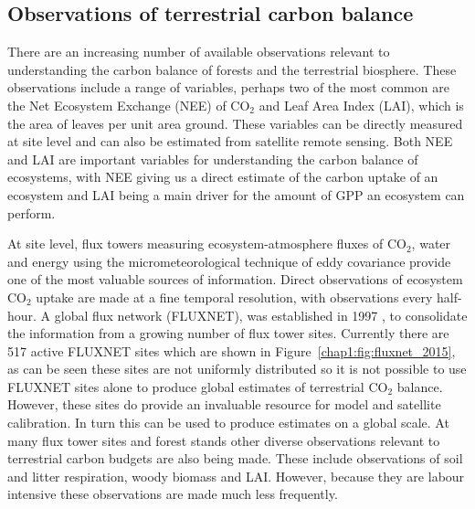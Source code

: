 


\subsection{Observations of terrestrial carbon balance}

There are an increasing number of available observations relevant to understanding the carbon balance of forests and the terrestrial biosphere. These observations include a range of variables, perhaps two of the most common are the Net Ecosystem Exchange (NEE) of CO\(_{2}\) and Leaf Area Index (LAI), which is the area of leaves per unit area ground. These variables can be directly measured at site level and can also be estimated from satellite remote sensing. Both NEE and LAI are important variables for understanding the carbon balance of ecosystems, with NEE giving us a direct estimate of the carbon uptake of an ecosystem and LAI being a main driver for the amount of GPP an ecosystem can perform.

At site level, flux towers measuring ecosystem-atmosphere fluxes of CO\(_{2}\), water and energy using the micrometeorological technique of eddy covariance provide one of the most valuable sources of information. Direct observations of ecosystem CO\(_{2}\) uptake are made at a fine temporal resolution, with observations every half-hour. A global flux network (FLUXNET), was established in 1997 \citep{baldocchi2001fluxnet}, to consolidate the information from a growing number of flux tower sites. Currently there are 517 active FLUXNET sites which are shown in Figure~\ref{chap1:fig:fluxnet_2015}, as can be seen these sites are not uniformly distributed so it is not possible to use FLUXNET sites alone to produce global estimates of terrestrial CO\(_{2}\) balance. However, these sites do provide an invaluable resource for model and satellite calibration. In turn this can be used to produce estimates on a global scale. At many flux tower sites and forest stands other diverse observations relevant to terrestrial carbon budgets are also being made. These include observations of soil and litter respiration, woody biomass and LAI. However, because they are labour intensive these observations are made much less frequently.     

